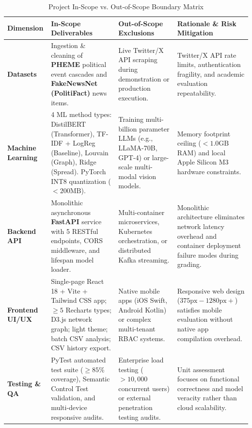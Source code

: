 \documentclass[11pt, a4paper]{article}
\begin{document}
\begin{table}[H]
  \centering
  \small
  \caption{Project In-Scope vs. Out-of-Scope Boundary Matrix}
  \label{tab:scope-boundaries}
  \begin{tabularx}{\textwidth}{@{}L{2.5cm} Y Y Y@{}}
    \toprule
    \textbf{Dimension} & \textbf{In-Scope Deliverables} & \textbf{Out-of-Scope Exclusions} & \textbf{Rationale \& Risk Mitigation} \\
    \midrule
    \textbf{Datasets} &
    Ingestion \& cleaning of \textbf{PHEME} political event cascades and \textbf{FakeNewsNet (PolitiFact)} news items. &
    Live Twitter/X API scraping during demonstration or production execution. &
    Twitter/X API rate limits, authentication fragility, and academic evaluation repeatability. \\
    \textbf{Machine Learning} &
    4 ML method types: DistilBERT (Transformer), TF-IDF + LogReg (Baseline), Louvain (Graph), Ridge (Spread). PyTorch INT8 quantization ($<200\text{MB}$). &
    Training multi-billion parameter LLMs (e.g., LLaMA-70B, GPT-4) or large-scale multi-modal vision models. &
    Memory footprint ceiling ($<1.0\text{GB}$ RAM) and local Apple Silicon M3 hardware constraints. \\
    \textbf{Backend API} &
    Monolithic asynchronous \textbf{FastAPI} service with 5 RESTful endpoints, CORS middleware, and lifespan model loader. &
    Multi-container microservices, Kubernetes orchestration, or distributed Kafka streaming. &
    Monolithic architecture eliminates network latency overhead and container deployment failure modes during grading. \\
    \textbf{Frontend UI/UX} &
    Single-page React 18 + Vite + Tailwind CSS app; $\ge 5$ Recharts types; D3.js network graph; light theme; batch CSV analysis; CSV history export. &
    Native mobile apps (iOS Swift, Android Kotlin) or complex multi-tenant RBAC systems. &
    Responsive web design ($375\text{px}-1280\text{px}+$) satisfies mobile evaluation without native app compilation overhead. \\
    \textbf{Testing \& QA} &
    PyTest automated test suite ($\ge 85$\% coverage), Semantic Control Test validation, and multi-device responsive audits. &
    Enterprise load testing ($>10,000$ concurrent users) or external penetration testing audits. &
    Unit assessment focuses on functional correctness and model veracity rather than cloud scalability. \\
    \bottomrule
  \end{tabularx}
\end{table}
\end{document}
